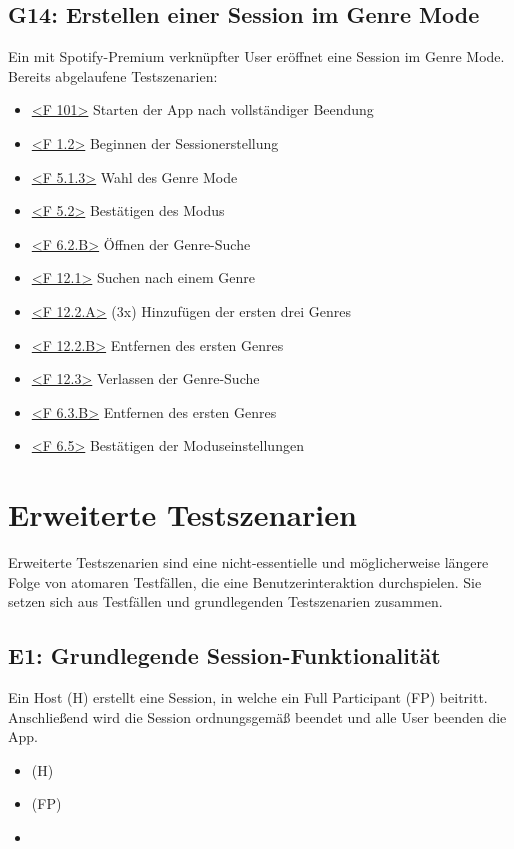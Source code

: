 \documentclass[oneside, ngerman]{sdqtechreport}
\begin{document}
\subsection{G14: Erstellen einer Session im Genre Mode}
\label{subsec:Tests:GrundlegendeTestszenarien:G14}
\hypertarget{G14}{}
\newcommand{\gFourteen}{\hyperlink{G14}{G14: Erstellen einer Session im Genre Mode }}
Ein mit Spotify-Premium verknüpfter User eröffnet eine Session im Genre Mode. \\
Bereits abgelaufene Testszenarien: \gNine
\begin{itemize}
    \item \hyperlink{<F 101>}{<F 101>} Starten der App nach vollständiger Beendung
    \item \hyperlink{<F 1.2>}{<F 1.2>} Beginnen der Sessionerstellung
    \item \hyperlink{<F 5.1.3>}{<F 5.1.3>} Wahl des Genre Mode
    \item \hyperlink{<F 5.2>}{<F 5.2>} Bestätigen des Modus
    \item \hyperlink{<F 6.2.B>}{<F 6.2.B>} Öffnen der Genre-Suche
    \item \hyperlink{<F 12.1>}{<F 12.1>} Suchen nach einem Genre
    \item \hyperlink{<F 12.2.A>}{<F 12.2.A>} (3x) Hinzufügen der ersten drei Genres
    \item \hyperlink{<F 12.2.B>}{<F 12.2.B>} Entfernen des ersten Genres
    \item \hyperlink{<F 12.3>}{<F 12.3>} Verlassen der Genre-Suche
    \item \hyperlink{<F 6.3.B>}{<F 6.3.B>} Entfernen des ersten Genres
    \item \hyperlink{<F 6.5>}{<F 6.5>} Bestätigen der Moduseinstellungen
\end{itemize}


\section{Erweiterte Testszenarien}
\label{sec:Tests:ErweiterteTestszenarien}

Erweiterte Testszenarien sind eine nicht-essentielle und möglicherweise längere Folge von atomaren Testfällen, die eine Benutzerinteraktion durchspielen. Sie setzen sich aus Testfällen und grundlegenden Testszenarien zusammen.


\subsection{E1: Grundlegende Session-Funktionalität}
\label{subsec:Tests:ErweiterteTestszenarien:E1}
Ein Host (H) erstellt eine Session, in welche ein Full Participant (FP) beitritt. Anschließend wird die Session ordnungsgemäß beendet und alle User beenden die App.
\begin{itemize}
    \item \gOne (H)
    \item \gTwo (FP)
    \item \gEight
\end{itemize}
\end{document}
